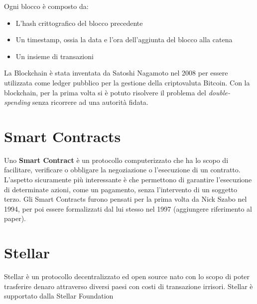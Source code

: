 Ogni blocco è composto da:
\begin{itemize}
	\item L'hash crittografico del blocco precedente
	\item Un timestamp, ossia la data e l'ora dell'aggiunta del blocco alla catena
	\item Un insieme di transazioni
\end{itemize}
La Blockchain è stata inventata da Satoshi Nagamoto nel 2008 per essere utilizzata 
come ledger pubblico per la gestione della criptovaluta Bitcoin. Con la blockchain,
per la prima volta si è potuto risolvere il problema del \textit{double-spending} 
senza ricorrere ad una autorità fidata.

\section{Smart Contracts}
Uno \textbf{Smart Contract} è un protocollo computerizzato che ha lo scopo di
facilitare, verificare o obbligare la negoziazione o l'esecuzione di un contratto.
L'aspetto sicuramente più interessante è che permettono di garantire l'esecuzione 
di determinate azioni, come un pagamento, senza l'intervento di un soggetto terzo. 
Gli Smart Contracts furono pensati per la prima volta da Nick Szabo nel 1994, per poi
essere formalizzati dal lui stesso nel 1997 (aggiungere riferimento al paper). 

\section{Stellar}

Stellar è un protocollo decentralizzato ed
open source nato con lo scopo di poter
trasferire denaro attraverso diversi
paesi con costi di transazione irrisori.
Stellar è supportato dalla Stellar Foundation